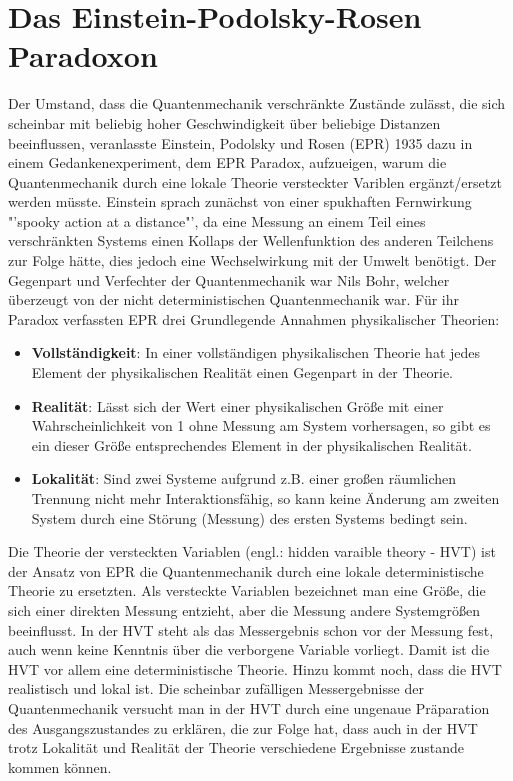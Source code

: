 \documentclass[twoside,colorback,accentcolor=tud4c,11pt]{tudreport}
\begin{document}
\section{Das Einstein-Podolsky-Rosen Paradoxon}
Der Umstand, dass die Quantenmechanik verschränkte Zustände zulässt, die sich scheinbar mit beliebig hoher Geschwindigkeit über beliebige Distanzen beeinflussen, veranlasste Einstein, Podolsky und Rosen (EPR) 1935 dazu in einem Gedankenexperiment, dem EPR Paradox, aufzueigen, warum die Quantenmechanik durch eine lokale Theorie versteckter Variblen ergänzt/ersetzt werden müsste. Einstein sprach zunächst von einer spukhaften Fernwirkung "'spooky action at a distance"', da eine Messung an einem Teil eines verschränkten Systems einen Kollaps der Wellenfunktion des anderen Teilchens zur Folge hätte, dies jedoch eine Wechselwirkung mit der Umwelt benötigt.
Der Gegenpart und Verfechter der Quantenmechanik war Nils Bohr, welcher überzeugt von der nicht deterministischen Quantenmechanik war.
Für ihr Paradox verfassten EPR drei Grundlegende Annahmen physikalischer Theorien:
\begin{itemize}
\item\textbf{Vollständigkeit}: In einer vollständigen physikalischen Theorie hat jedes Element der physikalischen Realität einen Gegenpart in der Theorie.
\item\textbf{Realität}: Lässt sich der Wert einer physikalischen Größe mit einer Wahrscheinlichkeit von 1 ohne Messung am System vorhersagen, so gibt es ein dieser Größe entsprechendes Element in der physikalischen Realität.
\item\textbf{Lokalität}: Sind zwei Systeme aufgrund z.B. einer großen räumlichen Trennung nicht mehr Interaktionsfähig, so kann keine Änderung am zweiten System durch eine Störung (Messung) des ersten Systems bedingt sein.
\end{itemize}
Die Theorie der versteckten Variablen (engl.: hidden varaible theory - HVT) ist der Ansatz von EPR die Quantenmechanik durch eine lokale deterministische Theorie zu ersetzten. Als versteckte Variablen bezeichnet man eine Größe, die sich einer direkten Messung entzieht, aber die Messung andere Systemgrößen beeinflusst. In der HVT steht als das Messergebnis schon vor der Messung fest, auch wenn keine Kenntnis über die verborgene Variable vorliegt. Damit ist die HVT vor allem eine deterministische Theorie. Hinzu kommt noch, dass die HVT realistisch und lokal ist. Die scheinbar zufälligen Messergebnisse der Quantenmechanik versucht man in der HVT durch eine ungenaue Präparation des Ausgangszustandes zu erklären, die zur Folge hat, dass auch in der HVT trotz Lokalität und Realität der Theorie verschiedene Ergebnisse zustande kommen können.
\end{document}
